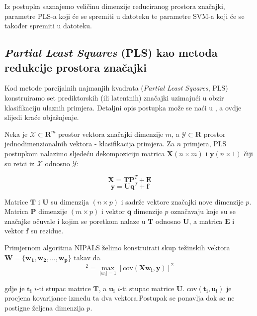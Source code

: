 \documentclass[seminar]{fer}
\begin{document}
Iz postupka saznajemo veličinu dimenzije reduciranog prostora značajki, parametre PLS-a koji će se spremiti u datoteku te parametre SVM-a koji će se također spremiti u datoteku.

\subsection{\emph{Partial Least Squares} (PLS) kao metoda redukcije prostora značajki} 
Kod metode parcijalnih najmanjih kvadrata (\emph{Partial Least Squares}, PLS) konstruiramo set prediktorskih (ili latentnih) značajki uzimajući u obzir klasifikaciju ulaznih primjera. 
Detaljni opis postupka može se naći u \cite{PLS}, a ovdje slijedi kraće objašnjenje.

Neka je $\mathcal{X} \subset \mathbf{R}^m$ prostor vektora značajki dimenzije $m$, a $\mathcal{Y} \subset \mathbf{R}$ prostor jednodimenzionalnih vektora - klasifikacija primjera. Za $n$ primjera, PLS postupkom nalazimo sljedeću dekompoziciju matrica $\mathbf{X} (n \times m) $ i $\mathbf{y} (n \times 1)$ čiji su retci iz $\mathcal{X}$ odnosno $\mathcal{Y}$:

\begin{equation*}
\mathbf{X} = \mathbf{T} \mathbf{P}^T + \mathbf{E} 
\end{equation*}
\begin{equation*}
\mathbf{y} = \mathbf{U} \mathbf{q}^T + \mathbf{f} 
\end{equation*}

Matrice $\mathbf{T}$ i $\mathbf{U}$ su dimenzija $(n \times p)$ i sadrže vektore značajki nove dimenzije $p$. Matrica $\mathbf{P}$ dimenzije $(m \times p)$ i vektor $\mathbf{q}$ dimenzije $p$ označavaju koje su se značajke očuvale i kojim se poretkom nalaze u $\mathbf{T}$ odnosno $\mathbf{U}$, a matrica $\mathbf{E}$ i vektor $\mathbf{f}$ su rezidue.

Primjernom algoritma NIPALS  želimo konstruirati skup težinskih vektora $\mathbf{W} = \{\mathbf{w_1}, \mathbf{w_2}, \dots,
\mathbf{w_p} \}$ takav da 
\begin{equation*}
[\mathrm{cov}(\mathbf{t_i}, \mathbf{u_i})]^ 2 = \max_{|w_i| = 1} [\mathrm{cov}(\mathbf{X}\mathbf{w_i} ,\mathbf{y})]^ 2
\end{equation*}

gdje je $\mathbf{t_i}$ $i$-ti stupac matrice $\mathbf{T}$, a $\mathbf{u_i}$ $i$-ti stupac matrice $\mathbf{U}$. $\mathrm{cov}(\mathbf{t_i}, \mathbf{u_i})$ je procjena kovarijance između ta dva vektora.Postupak se ponavlja dok se ne postigne željena dimenzija $p$. 
\end{document}

